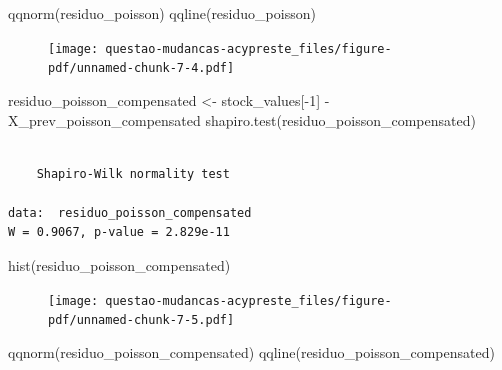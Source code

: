 \documentclass[
  letterpaper,
  DIV=11,
  numbers=noendperiod]{scrreprt}
\newenvironment{Shaded}{\begin{snugshade}}{\end{snugshade}}
\newcommand{\DecValTok}[1]{\textcolor[rgb]{0.68,0.00,0.00}{#1}}
\newcommand{\FunctionTok}[1]{\textcolor[rgb]{0.28,0.35,0.67}{#1}}
\newcommand{\NormalTok}[1]{\textcolor[rgb]{0.00,0.23,0.31}{#1}}
\newcommand{\OtherTok}[1]{\textcolor[rgb]{0.00,0.23,0.31}{#1}}
\newcommand{\SpecialCharTok}[1]{\textcolor[rgb]{0.37,0.37,0.37}{#1}}
\begin{document}
\begin{Shaded}
\begin{Highlighting}[]
\FunctionTok{qqnorm}\NormalTok{(residuo\_poisson)}
\FunctionTok{qqline}\NormalTok{(residuo\_poisson)}
\end{Highlighting}
\end{Shaded}

\begin{figure}[H]

{\centering \texttt{[image: questao-mudancas-acypreste\_files/figure-pdf/unnamed-chunk-7-4.pdf]}

}

\end{figure}

\begin{Shaded}
\begin{Highlighting}[]
\NormalTok{residuo\_poisson\_compensated }\OtherTok{\textless{}{-}}\NormalTok{ stock\_values[}\SpecialCharTok{{-}}\DecValTok{1}\NormalTok{] }\SpecialCharTok{{-}}\NormalTok{ X\_prev\_poisson\_compensated}
\FunctionTok{shapiro.test}\NormalTok{(residuo\_poisson\_compensated)}
\end{Highlighting}
\end{Shaded}

\begin{verbatim}

    Shapiro-Wilk normality test

data:  residuo_poisson_compensated
W = 0.9067, p-value = 2.829e-11
\end{verbatim}

\begin{Shaded}
\begin{Highlighting}[]
\FunctionTok{hist}\NormalTok{(residuo\_poisson\_compensated)}
\end{Highlighting}
\end{Shaded}

\begin{figure}[H]

{\centering \texttt{[image: questao-mudancas-acypreste\_files/figure-pdf/unnamed-chunk-7-5.pdf]}

}

\end{figure}

\begin{Shaded}
\begin{Highlighting}[]
\FunctionTok{qqnorm}\NormalTok{(residuo\_poisson\_compensated)}
\FunctionTok{qqline}\NormalTok{(residuo\_poisson\_compensated)}
\end{Highlighting}
\end{Shaded}
\end{document}
